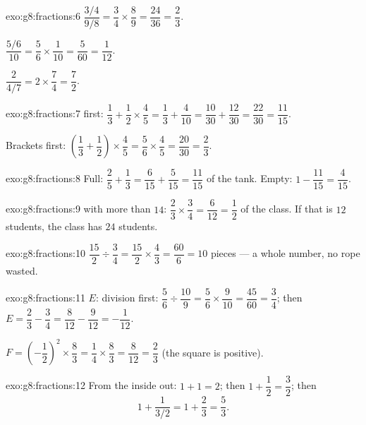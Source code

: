 \begin{solution}{exo:g8:fractions:6}
$\dfrac{3/4}{9/8} = \dfrac34 \times \dfrac89 = \dfrac{24}{36} =
\dfrac23$.

$\dfrac{5/6}{10} = \dfrac56 \times \dfrac{1}{10} = \dfrac{5}{60} =
\dfrac{1}{12}$.

$\dfrac{2}{4/7} = 2 \times \dfrac74 = \dfrac72$.
\end{solution}

\begin{solution}{exo:g8:fractions:7}
 first:
$\dfrac13 + \dfrac12 \times \dfrac45 = \dfrac13 + \dfrac{4}{10}
= \dfrac{10}{30} + \dfrac{12}{30} = \dfrac{22}{30} = \dfrac{11}{15}$.

Brackets first:
$\left(\dfrac13 + \dfrac12\right) \times \dfrac45
= \dfrac56 \times \dfrac45 = \dfrac{20}{30} = \dfrac23$.
\end{solution}

\begin{solution}{exo:g8:fractions:8}
Full: $\dfrac25 + \dfrac13 = \dfrac{6}{15} + \dfrac{5}{15} =
\dfrac{11}{15}$ of the tank. Empty:
$1 - \dfrac{11}{15} = \dfrac{4}{15}$.
\end{solution}

\begin{solution}{exo:g8:fractions:9}
 with more than $14$:
$\dfrac23 \times \dfrac34 = \dfrac{6}{12} = \dfrac12$ of the class.
If that is $12$ students, the class has $24$ students.
\end{solution}

\begin{solution}{exo:g8:fractions:10}
$\dfrac{15}{2} \div \dfrac34 = \dfrac{15}{2} \times \dfrac43
= \dfrac{60}{6} = 10$ pieces --- a whole number, no rope wasted.
\end{solution}

\begin{solution}{exo:g8:fractions:11}
$E$: division first:
$\dfrac56 \div \dfrac{10}{9} = \dfrac56 \times \dfrac{9}{10}
= \dfrac{45}{60} = \dfrac34$; then
$E = \dfrac23 - \dfrac34 = \dfrac{8}{12} - \dfrac{9}{12} =
-\dfrac{1}{12}$.

$F = \left(-\dfrac12\right)^2 \times \dfrac83 = \dfrac14 \times
\dfrac83 = \dfrac{8}{12} = \dfrac23$ (the square is positive).
\end{solution}

\begin{solution}{exo:g8:fractions:12}
From the inside out: $1 + 1 = 2$; then
$1 + \dfrac12 = \dfrac32$; then
\[
1 + \frac{1}{3/2} = 1 + \frac23 = \frac53 .
\]
\end{solution}

